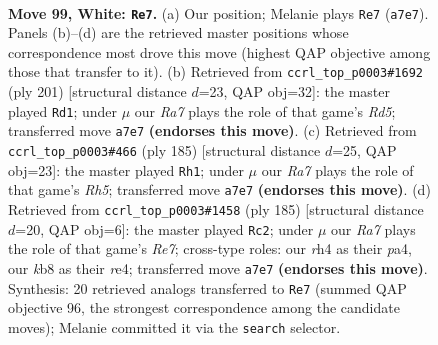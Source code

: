 \documentclass[11pt]{article}
\begin{document}
\clearpage

\begin{figure}[p]\centering
\begin{subfigure}{0.46\textwidth}\centering
\resizebox{\linewidth}{!}{%
\newchessgame
\chessboard[
  setfen={1k6/R7/8/7n/p6r/P7/7p/7K w - - 24 99},
  showmover=false,
  pgfstyle=straightmove, color=movearrow, markmove={a7-e7}
]}
\caption{}
\end{subfigure}\hfill
\begin{subfigure}{0.46\textwidth}\centering
\resizebox{\linewidth}{!}{%
\newchessgame
\chessboard[
  setfen={8/8/8/4K3/kP1r4/P3R3/8/8 b - - 76 101},
  showmover=false,
  pgfstyle=straightmove, color=movearrow, markmove={d4-d1}
]}
\caption{}
\end{subfigure}
\\[4pt]
\begin{subfigure}{0.46\textwidth}\centering
\resizebox{\linewidth}{!}{%
\newchessgame
\chessboard[
  setfen={8/8/5k2/1R5P/5P1r/6K1/8/8 b - - 88 93},
  showmover=false,
  pgfstyle=straightmove, color=movearrow, markmove={h4-h1}
]}
\caption{}
\end{subfigure}\hfill
\begin{subfigure}{0.46\textwidth}\centering
\resizebox{\linewidth}{!}{%
\newchessgame
\chessboard[
  setfen={8/8/8/pPk1K3/P3R3/8/4r3/8 b - - 84 93},
  showmover=false,
  pgfstyle=straightmove, color=movearrow, markmove={e2-c2}
]}
\caption{}
\end{subfigure}
\caption{\textbf{Move 99, White: \texttt{Re7}.} (a) Our position; Melanie plays \texttt{Re7} (\texttt{a7e7}). Panels (b)--(d) are the retrieved master positions whose correspondence most drove this move (highest QAP objective among those that transfer to it). (b) Retrieved from \texttt{ccrl\_top\_p0003\#1692} (ply 201) [structural distance $d$=23, QAP obj=32]: the master played \texttt{Rd1}; under $\mu$ our \emph{Ra7} plays the role of that game's \emph{Rd5}; transferred move \texttt{a7e7} \textbf{(endorses this move)}. (c) Retrieved from \texttt{ccrl\_top\_p0003\#466} (ply 185) [structural distance $d$=25, QAP obj=23]: the master played \texttt{Rh1}; under $\mu$ our \emph{Ra7} plays the role of that game's \emph{Rh5}; transferred move \texttt{a7e7} \textbf{(endorses this move)}. (d) Retrieved from \texttt{ccrl\_top\_p0003\#1458} (ply 185) [structural distance $d$=20, QAP obj=6]: the master played \texttt{Rc2}; under $\mu$ our \emph{Ra7} plays the role of that game's \emph{Re7}; cross-type roles: our \emph{r}h4 as their \emph{p}a4, our \emph{k}b8 as their \emph{r}e4; transferred move \texttt{a7e7} \textbf{(endorses this move)}. Synthesis: 20 retrieved analogs transferred to \texttt{Re7} (summed QAP objective 96, the strongest correspondence among the candidate moves); Melanie committed it via the \texttt{search} selector.}
\label{fig:thought-m196}
\end{figure}
\end{document}
